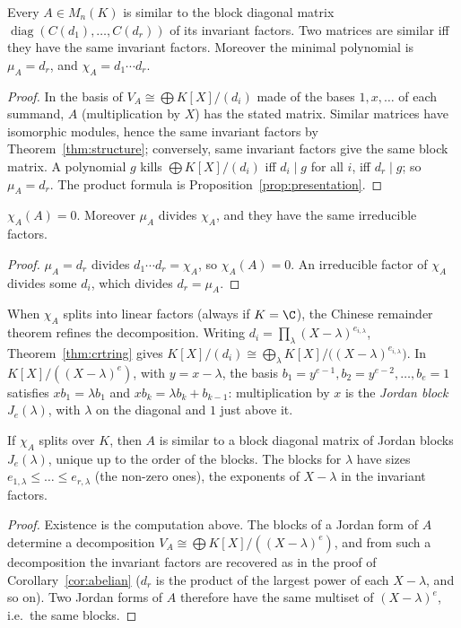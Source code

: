 \begin{theorem}\label{thm:frobenius}
Every $A\in M_n(K)$ is similar to the block diagonal matrix $\operatorname{diag}(C(d_1),\dots,C(d_r))$ of its invariant factors. Two matrices are similar iff they have the same invariant factors. Moreover the minimal polynomial is $\mu_A=d_r$, and $\chi_A=d_1\cdots d_r$.
\end{theorem}
\begin{proof}
In the basis of $V_A\cong\bigoplus K[X]/(d_i)$ made of the bases $1,x,\dots$ of each summand, $A$ (multiplication by $X$) has the stated matrix. Similar matrices have isomorphic modules, hence the same invariant factors by Theorem~\ref{thm:structure}; conversely, same invariant factors give the same block matrix. A polynomial $g$ kills $\bigoplus K[X]/(d_i)$ iff $d_i\mid g$ for all $i$, iff $d_r\mid g$; so $\mu_A=d_r$. The product formula is Proposition~\ref{prop:presentation}.
\end{proof}

\begin{corollary}\label{cor:cayleyhamilton}
$\chi_A(A)=0$. Moreover $\mu_A$ divides $\chi_A$, and they have the same irreducible factors.
\end{corollary}
\begin{proof}
$\mu_A=d_r$ divides $d_1\cdots d_r=\chi_A$, so $\chi_A(A)=0$. An irreducible factor of $\chi_A$ divides some $d_i$, which divides $d_r=\mu_A$.
\end{proof}

When $\chi_A$ splits into linear factors (always if $K=\C$), the Chinese remainder theorem refines the decomposition. Writing $d_i=\prod_\lambda(X-\lambda)^{e_{i,\lambda}}$, Theorem~\ref{thm:crtring} gives $K[X]/(d_i)\cong\bigoplus_\lambda K[X]/\bigl((X-\lambda)^{e_{i,\lambda}}\bigr)$. In $K[X]/((X-\lambda)^e)$, with $y=x-\lambda$, the basis $b_1=y^{e-1},b_2=y^{e-2},\dots,b_e=1$ satisfies $xb_1=\lambda b_1$ and $xb_k=\lambda b_k+b_{k-1}$: multiplication by $x$ is the \emph{Jordan block} $J_e(\lambda)$, with $\lambda$ on the diagonal and $1$ just above it.

\begin{theorem}\label{thm:jordan}
If $\chi_A$ splits over $K$, then $A$ is similar to a block diagonal matrix of Jordan blocks $J_{e}(\lambda)$, unique up to the order of the blocks. The blocks for $\lambda$ have sizes $e_{1,\lambda}\le\dots\le e_{r,\lambda}$ (the non-zero ones), the exponents of $X-\lambda$ in the invariant factors.
\end{theorem}
\begin{proof}
Existence is the computation above. The blocks of a Jordan form of $A$ determine a decomposition $V_A\cong\bigoplus K[X]/((X-\lambda)^e)$, and from such a decomposition the invariant factors are recovered as in the proof of Corollary~\ref{cor:abelian} ($d_r$ is the product of the largest power of each $X-\lambda$, and so on). Two Jordan forms of $A$ therefore have the same multiset of $(X-\lambda)^e$, i.e.\ the same blocks.
\end{proof}

